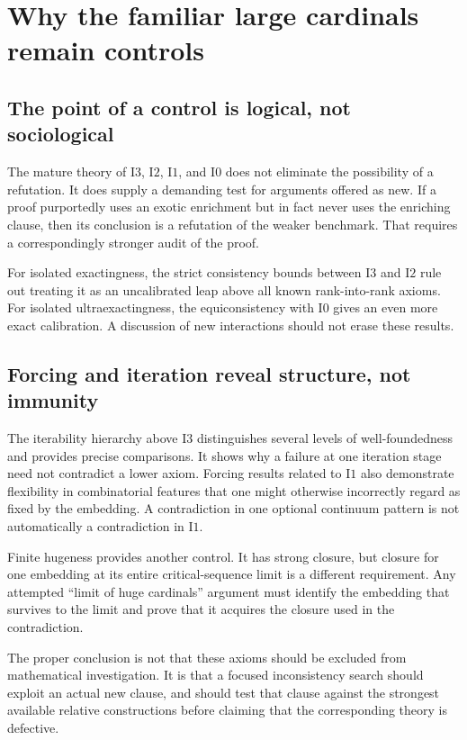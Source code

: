 \documentclass[11pt,letterpaper]{article}
\theoremstyle{definition}
\newcommand{\Izero}{\mathrm{I0}}
\newcommand{\Ione}{\mathrm{I1}}
\newcommand{\Itwo}{\mathrm{I2}}
\newcommand{\Ithree}{\mathrm{I3}}
\begin{document}
\section{Why the familiar large cardinals remain controls}\label{sec:controls}

\subsection{The point of a control is logical, not sociological}

The mature theory of $\Ithree$, $\Itwo$, $\Ione$, and $\Izero$ does not eliminate the possibility of a refutation. It does supply a demanding test for arguments offered as new. If a proof purportedly uses an exotic enrichment but in fact never uses the enriching clause, then its conclusion is a refutation of the weaker benchmark. That requires a correspondingly stronger audit of the proof.

For isolated exactingness, the strict consistency bounds between $\Ithree$ and $\Itwo$ rule out treating it as an uncalibrated leap above all known rank-into-rank axioms. For isolated ultraexactingness, the equiconsistency with $\Izero$ gives an even more exact calibration. A discussion of new interactions should not erase these results. \cite{abgl}

\subsection{Forcing and iteration reveal structure, not immunity}

The iterability hierarchy above $\Ithree$ distinguishes several levels of well-foundedness and provides precise comparisons. It shows why a failure at one iteration stage need not contradict a lower axiom. Forcing results related to $\Ione$ also demonstrate flexibility in combinatorial features that one might otherwise incorrectly regard as fixed by the embedding. A contradiction in one optional continuum pattern is not automatically a contradiction in $\Ione$. \cite{iterability,dimwu}

Finite hugeness provides another control. It has strong closure, but closure for one embedding at its entire critical-sequence limit is a different requirement. Any attempted ``limit of huge cardinals'' argument must identify the embedding that survives to the limit and prove that it acquires the closure used in the contradiction. \cite{dimonte,goldberge}

The proper conclusion is not that these axioms should be excluded from mathematical investigation. It is that a focused inconsistency search should exploit an actual new clause, and should test that clause against the strongest available relative constructions before claiming that the corresponding theory is defective.
\end{document}
